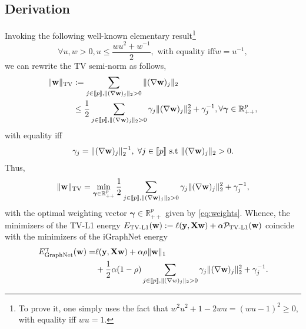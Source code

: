 \subsection{Derivation}
Invoking the following
well-known elementary result\footnote{To prove it, one simply uses the fact
  that $w^2u^2 + 1 - 2wu = (wu - 1)^2 \ge 0$, with equality iff $wu =
  1$.}
\begin{equation}
\label{eq:rabbit}
\forall u,w > 0, u \le \frac{wu^2 + w^{-1}}{2},\text{ with equality iff
} w = u^{-1},
\end{equation}
we can rewrite the TV semi-norm as follows,
\begin{eqnarray}
\begin{split}
 \|\mathbf{w}\|_{\text{TV}} &:= \sum_{j \in [\![p]\!],\|(\nabla \mathbf{w})_j\|_2 > 0}\|(\nabla
 \mathbf{w})_j\|_2\\
 &\le \frac{1}{2}
\sum_{j \in [\![p]\!],\|(\nabla \mathbf{w})_j\|_2 > 0} \gamma_j\|(\nabla \mathbf{w})_j\|_2^2 + \gamma_j^{-1},
\forall \boldsymbol{\gamma} \in \mathbb R_{++}^p,
\end{split}
\end{eqnarray}
with equality  iff
\begin{eqnarray}
\gamma_j = \|(\nabla \mathbf{w})_j\|_2^{-1},\;\forall j \in [\![p]\!]\text{ s.t }\|(\nabla \mathbf{w})_j\|_2 > 0.
\label{eq:weights}
\end{eqnarray}
Thus,
\begin{eqnarray}
\|\mathbf{w}\|_{\text{TV}} = \min_{\boldsymbol{\gamma} \in
  \mathbb R_{++}^p}
\frac{1}{2}\sum_{j \in [\![p]\!],\|(\nabla \mathbf{w})_j\|_2 > 0} \gamma_j\|(\nabla \mathbf{w})_j\|_2^2 + \gamma_j^{-1}
,
\end{eqnarray}
with the optimal weighting vector $\boldsymbol{\gamma} \in \mathbb R_{++}^p$ given by
\eqref{eq:weights}. Whence, the minimizers of the TV-L1 energy
$E_{\text{TV-L1}}(\mathbf{w}) := \ell(\mathbf{y},\mathbf{X}\mathbf{w}) + \alpha \mathcal P_{\text{TV-L1}}(\mathbf{w})$ coincide with the minimizers of
the iGraphNet energy
\begin{equation}
\begin{split}
E_{\text{GraphNet}}^{\boldsymbol{\gamma}}(\mathbf{w}) = &\ell(\mathbf{y},\mathbf{X}\mathbf{w}) +
\alpha\rho\|\mathbf{w}\|_1\\
&+ \frac{1}{2}\alpha(1 - \rho)
\sum_{j \in [\![p]\!],\|(\nabla w)_j\|_2 > 0} \gamma_j\|(\nabla \mathbf{w})_j\|_2^2
+ \gamma_j^{-1}.
\end{split}
\label{eq:rgn}
\end{equation}
